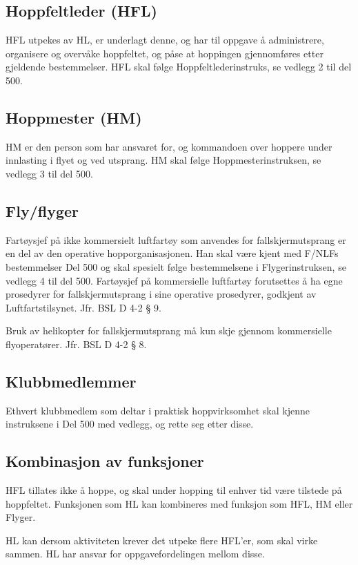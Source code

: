 \subsection{Hoppfeltleder (HFL)}
HFL utpekes av HL, er underlagt denne, og har til oppgave å administrere, organisere og overvåke hoppfeltet, og påse at hoppingen gjennomføres etter gjeldende bestemmelser. HFL skal følge Hoppfeltlederinstruks, se vedlegg 2 til del 500.

\subsection{Hoppmester (HM)}
HM er den person som har ansvaret for, og kommandoen over hoppere under innlasting i flyet og ved utsprang. HM skal følge Hoppmesterinstruksen, se vedlegg 3 til del 500.

\subsection{Fly/flyger}
Fartøysjef på ikke kommersielt luftfartøy som anvendes for fallskjermutsprang er en del av den operative hopporganisasjonen. Han skal være kjent med F/NLFs bestemmelser Del 500 og skal spesielt følge bestemmelsene i Flygerinstruksen, se vedlegg 4 til del 500. Fartøysjef på kommersielle luftfartøy forutsettes å ha egne prosedyrer for fallskjermutsprang i sine operative prosedyrer, godkjent av Luftfartstilsynet. Jfr. BSL D 4-2 § 9.

Bruk av helikopter for fallskjermutsprang må kun skje gjennom kommersielle flyoperatører. Jfr. BSL D 4-2 § 8.

\subsection{Klubbmedlemmer}
Ethvert klubbmedlem som deltar i praktisk hoppvirksomhet skal kjenne instruksene i Del 500 med vedlegg, og rette seg etter disse.

\subsection{Kombinasjon av funksjoner}
HFL tillates ikke å hoppe, og skal under hopping til enhver tid være tilstede på hoppfeltet. Funksjonen som HL kan kombineres med funksjon som HFL, HM eller Flyger.

HL kan dersom aktiviteten krever det utpeke flere HFL’er, som skal virke sammen. HL har ansvar for oppgavefordelingen mellom disse.

